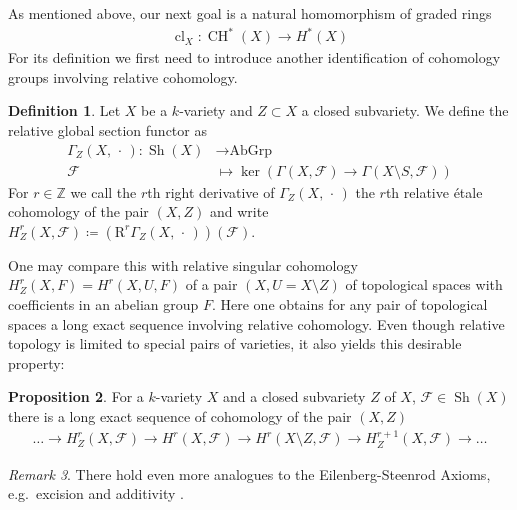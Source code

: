 \documentclass[english]{scrartcl}
\theoremstyle{definition}
\newtheorem{Def}{Definition}[section]
\newtheorem{Prop}[Def]{Proposition}
\theoremstyle{remark}
\newtheorem{Rem}[Def]{Remark}
\newcommand*{\Z}{\mathds{Z}}
\newcommand*{\F}{\mathcal{F}} %
\DeclareMathOperator{\Sh}{Sh} %
\newcommand*{\forexample}{e.g.\ }
\newcommand*{\argreplacement}{\,\cdot\,} %
\DeclareMathOperator{\CH}{CH} %
\DeclareMathOperator{\CL}{cl} %
\begin{document}
As mentioned above, our next goal is a natural homomorphism of graded rings
\begin{gather*}
  \CL_X\colon \CH^*(X)\rightarrow H^*(X)
\end{gather*}
For its definition we first need to introduce another identification
of cohomology groups involving relative cohomology.

\begin{Def}\label{def:relcoh}
  Let $X$ be a $k$-variety and $Z\subset X$ a closed subvariety.
  We define the relative global section functor as
  \begin{align*}
    \Gamma_Z(X,\argreplacement) \colon \Sh(X) &\longrightarrow \text{AbGrp}\\
    \F &\longmapsto \ker\left(\Gamma(X,\F)\to \Gamma(X\setminus S,\F)\right)
  \end{align*}
  For $r\in\Z$ we call the $r$th right derivative of
  $\Gamma_Z(X,\argreplacement)$ the $r$th relative étale cohomology of the pair
  $(X,Z)$ and write
  $H_Z^r(X,\F)\coloneqq\left(\mathrm R^r\Gamma_Z(X,\argreplacement)\right)(\F)$.
\end{Def}
One may compare this with relative singular cohomology $H_Z^r(X,F)=H^r(X,U,F)$
of a pair $(X,U=X\setminus Z)$ of topological spaces with coefficients
in an abelian group $F$. Here one obtains for any pair of topological
spaces a long exact sequence involving relative cohomology.
Even though relative topology is limited to special pairs of
varieties, it also yields this desirable property:
\begin{Prop}\label{lesrelcoh}
  For a $k$-variety $X$ and a closed subvariety $Z$ of $X$,
  $\F\in\Sh(X)$ there is a long exact sequence of cohomology of the
  pair $(X,Z)$
  \begin{gather*}
    \dotsc
    \to H_Z^r(X,\F)
    \to H^r(X,\F)
    \to H^r(X\setminus Z,\F)
    \to H_Z^{r+1}(X,\F)
    \to \dotsc
  \end{gather*}
\end{Prop}
\begin{Rem}
  There hold even more analogues to the Eilenberg-Steenrod Axioms,
  \forexample excision and additivity \cite[][Chap.~9]{milne}.
\end{Rem}
\end{document}

